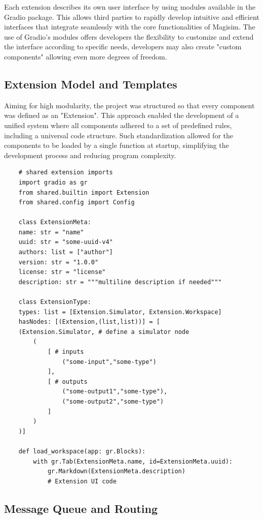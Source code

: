 \documentclass[11pt, a4paper, titlepage]{article}
\begin{document}
Each extension describes its own user interface by using modules available in the Gradio package. This allows third parties to rapidly develop intuitive and efficient interfaces that integrate seamlessly with the core functionalities of Magisim. The use of Gradio's modules offers developers the flexibility to customize and extend the interface according to specific needs, developers may also create "custom components" allowing even more degrees of freedom.
\newpage
\subsection{Extension Model and Templates}

Aiming for high modularity, the project was structured so that every component was defined as an "Extension". This approach enabled the development of a unified system where all components adhered to a set of predefined rules, including a universal code structure. Such standardization allowed for the components to be loaded by a single function at startup, simplifying the development process and reducing program complexity.

\begin{verbatim}
	# shared extension imports
	import gradio as gr
	from shared.builtin import Extension
	from shared.config import Config
	
	class ExtensionMeta:
	name: str = "name"
	uuid: str = "some-uuid-v4"
	authors: list = ["author"]
	version: str = "1.0.0"
	license: str = "license"
	description: str = """multiline description if needed"""

	class ExtensionType:
	types: list = [Extension.Simulator, Extension.Workspace]
	hasNodes: [(Extension,(list,list))] = [
	(Extension.Simulator, # define a simulator node
		(
			[ # inputs
				("some-input","some-type")
			],
			[ # outputs
				("some-output1","some-type"), 
				("some-output2","some-type")
			]
		)
	)]
	
	def load_workspace(app: gr.Blocks):
		with gr.Tab(ExtensionMeta.name, id=ExtensionMeta.uuid):
			gr.Markdown(ExtensionMeta.description)
			# Extension UI code

\end{verbatim}
\newpage

\subsection{Message Queue and Routing}
\end{document}
